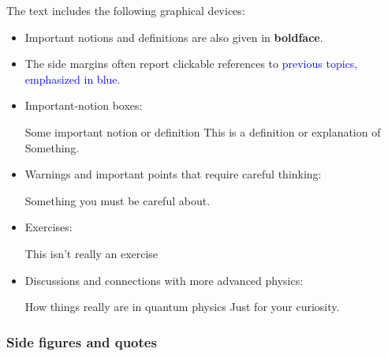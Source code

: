 \documentclass[a4paper,12pt,%
onecolumn,oneside,%
british%
]{memoir}
\renewcommand*{\|}[1][]{\nonscript\:#1\vert\nonscript\:\mathopen{}}
\newcommand*{\sect}{\S}%
\renewcommand*{\autoref}[2]{\sidepar{\vspace{-1ex}\footnotesize{\color{blue}\faIcon{%
angle-right%
}\enskip\sect~\ref{#1} page~\pageref{#1}}}\textcolor{blue}{#2}}
\begin{document}
The text includes the following graphical devices:
\begin{itemize}[para]
\item Important notions and definitions are also given in \textbf{boldface}.

\item\label{sec:self-reference}

The side margins often report clickable references to \autoref{sec:self-reference}{previous topics, emphasized in blue}.

\item Important-notion boxes:
  \begin{definition}{Some important notion or definition}
    This is a definition or explanation of Something.
  \end{definition}
\item Warnings and important points that require careful thinking:
  \begin{warning}[Careful!]
    Something you must be careful about.
  \end{warning}
\item Exercises:
  \begin{exercise}
    This isn't really an exercise
  \end{exercise}
\item Discussions and connections with more advanced physics:
  \begin{extra}{How things really are in quantum physics}
    Just for your curiosity.
  \end{extra}
\end{itemize}

\subsubsection{\texorpdfstring{\enskip}{}Side figures and quotes}
\end{document}
